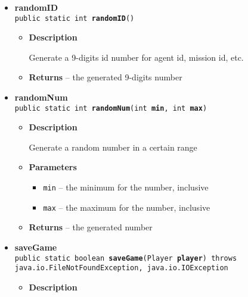{{{{{{\begin{itemize}
{\begin{itemize}
{Process the user's input
}
\item{
{\bf  Parameters}
  \begin{itemize}
   \item{
\texttt{uinput} -- the user's input}
   \item{
\texttt{player} -- the player}
  \end{itemize}
}%
\end{itemize}
}%
\item{ 
{\bf  randomID}\\
\texttt{public static int\ {\bf  randomID}()
\label{personOfInterest.Game.randomID()}}%
\begin{itemize}
\item{
{\bf  Description}

Generate a 9-digits id number for agent id, mission id, etc.
}
\item{{\bf  Returns} -- 
the generated 9-digits number 
}%
\end{itemize}
}%
\item{ 
{\bf  randomNum}\\
\texttt{public static int\ {\bf  randomNum}(\texttt{int} {\bf  min},
\texttt{int} {\bf  max})
\label{personOfInterest.Game.randomNum(int, int)}}%
\begin{itemize}
\item{
{\bf  Description}

Generate a random number in a certain range
}
\item{
{\bf  Parameters}
  \begin{itemize}
   \item{
\texttt{min} -- the minimum for the number, inclusive}
   \item{
\texttt{max} -- the maximum for the number, inclusive}
  \end{itemize}
}%
\item{{\bf  Returns} -- 
the generated number 
}%
\end{itemize}
}%
\item{ 
{\bf  saveGame}\\
\texttt{public static boolean\ {\bf  saveGame}(\texttt{Player} {\bf  player}) throws java.io.FileNotFoundException, java.io.IOException
\label{personOfInterest.Game.saveGame(personOfInterest.Player)}}%
\begin{itemize}
\item{
{\bf  Description}

}
\end{itemize}}
\end{itemize}}}}}}}
